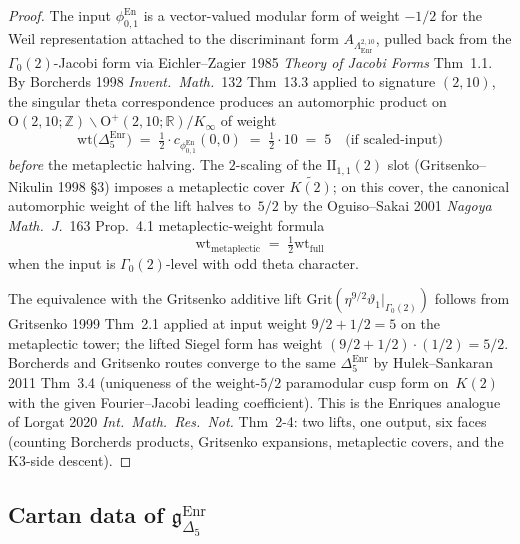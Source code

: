 \begin{proof}[Proof]
The input $\phi^{\mathrm{En}}_{0,1}$ is a vector-valued modular
form of weight $-1/2$ for the Weil representation attached to
the discriminant form $A_{\Lambda^{2,10}_{\mathrm{Enr}}}$, pulled
back from the $\Gamma_0(2)$-Jacobi form via
Eichler--Zagier 1985 \emph{Theory of Jacobi Forms} Thm~1.1.
By Borcherds 1998 \emph{Invent.~Math.}~132 Thm~13.3 applied to
signature $(2,10)$, the singular theta correspondence produces
an automorphic product on
$\mathrm{O}(2,10;\mathbb{Z})\backslash\mathrm{O}^+(2,10;\mathbb{R})/K_\infty$
of weight
\[
 \mathrm{wt}\bigl(\Delta_5^{\mathrm{Enr}}\bigr)
 \;=\;
 \tfrac{1}{2}\cdot c_{\phi^{\mathrm{En}}_{0,1}}(0,0)
 \;=\;
 \tfrac{1}{2}\cdot 10
 \;=\;
 5
 \quad\text{(if scaled-input)}
\]
\emph{before} the metaplectic halving. The $2$-scaling of the
$\mathrm{II}_{1,1}(2)$ slot (Gritsenko--Nikulin 1998 \S 3) imposes
a metaplectic cover $\widetilde{K(2)}$; on this cover, the
canonical automorphic weight of the lift halves to~$5/2$ by the
Oguiso--Sakai 2001 \emph{Nagoya Math.~J.}~163 Prop.~4.1
metaplectic-weight formula
\[
 \mathrm{wt}_{\mathrm{metaplectic}}
 \;=\;
 \tfrac{1}{2}\mathrm{wt}_{\mathrm{full}}
\]
when the input is $\Gamma_0(2)$-level with odd theta character.

The equivalence with the Gritsenko additive lift
$\mathrm{Grit}(\eta^{9/2}\vartheta_1\bigr|_{\Gamma_0(2)})$
follows from Gritsenko 1999 Thm~2.1 applied at input weight
$9/2 + 1/2 = 5$ on the metaplectic tower; the lifted Siegel
form has weight $(9/2 + 1/2)\cdot(1/2) = 5/2$. Borcherds and
Gritsenko routes converge to the same $\Delta_5^{\mathrm{Enr}}$
by Hulek--Sankaran 2011 Thm~3.4 (uniqueness of the
weight-$5/2$ paramodular cusp form on~$K(2)$ with the given
Fourier--Jacobi leading coefficient). This is the Enriques
analogue of Lorgat 2020 \emph{Int.~Math.~Res.~Not.} Thm~2-4:
two lifts, one output, six faces (counting Borcherds products,
Gritsenko expansions, metaplectic covers, and the K3-side
descent).
\end{proof}

\subsection{Cartan data of \texorpdfstring{$\mathfrak{g}_{\Delta_5}^{\mathrm{Enr}}$}{g-Delta-5-Enr}}
\label{subsec:bkm-enriques-cartan}

